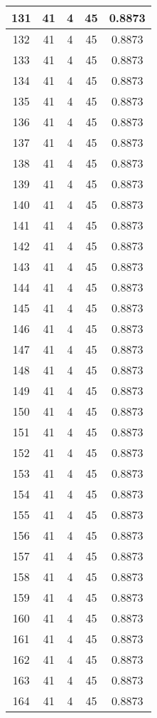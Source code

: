 \documentclass[letterpaper, 12pt]{article}
\begin{document}
\begin{longtable}{|c|c|c|c|c|}
\hline
131 & 41 & 4 & 45 & 0.8873 \\
\hline
132 & 41 & 4 & 45 & 0.8873 \\
\hline
133 & 41 & 4 & 45 & 0.8873 \\
\hline
134 & 41 & 4 & 45 & 0.8873 \\
\hline
135 & 41 & 4 & 45 & 0.8873 \\
\hline
136 & 41 & 4 & 45 & 0.8873 \\
\hline
137 & 41 & 4 & 45 & 0.8873 \\
\hline
138 & 41 & 4 & 45 & 0.8873 \\
\hline
139 & 41 & 4 & 45 & 0.8873 \\
\hline
140 & 41 & 4 & 45 & 0.8873 \\
\hline
141 & 41 & 4 & 45 & 0.8873 \\
\hline
142 & 41 & 4 & 45 & 0.8873 \\
\hline
143 & 41 & 4 & 45 & 0.8873 \\
\hline
144 & 41 & 4 & 45 & 0.8873 \\
\hline
145 & 41 & 4 & 45 & 0.8873 \\
\hline
146 & 41 & 4 & 45 & 0.8873 \\
\hline
147 & 41 & 4 & 45 & 0.8873 \\
\hline
148 & 41 & 4 & 45 & 0.8873 \\
\hline
149 & 41 & 4 & 45 & 0.8873 \\
\hline
150 & 41 & 4 & 45 & 0.8873 \\
\hline
151 & 41 & 4 & 45 & 0.8873 \\
\hline
152 & 41 & 4 & 45 & 0.8873 \\
\hline
153 & 41 & 4 & 45 & 0.8873 \\
\hline
154 & 41 & 4 & 45 & 0.8873 \\
\hline
155 & 41 & 4 & 45 & 0.8873 \\
\hline
156 & 41 & 4 & 45 & 0.8873 \\
\hline
157 & 41 & 4 & 45 & 0.8873 \\
\hline
158 & 41 & 4 & 45 & 0.8873 \\
\hline
159 & 41 & 4 & 45 & 0.8873 \\
\hline
160 & 41 & 4 & 45 & 0.8873 \\
\hline
161 & 41 & 4 & 45 & 0.8873 \\
\hline
162 & 41 & 4 & 45 & 0.8873 \\
\hline
163 & 41 & 4 & 45 & 0.8873 \\
\hline
164 & 41 & 4 & 45 & 0.8873 \\

\end{longtable}
\end{document}
